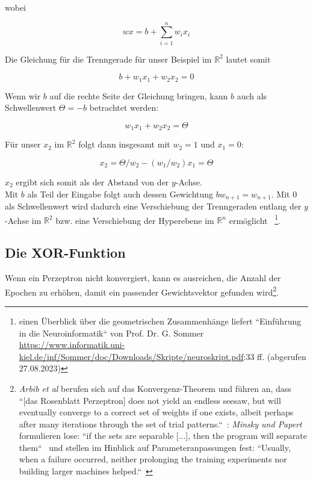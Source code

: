 \noindent
wobei

\begin{equation}
wx = b + \sum^n_{i=1} w_ix_i
\label{eq:gl-net}
\end{equation}

\noindent
Die Gleichung für die Trenngerade für unser Beispiel im $\mathbb{R}^2$ lautet somit

\begin{equation}
b + w_1x_1 + w_2x_2 = 0
\end{equation}

\noindent
Wenn wir $b$ auf die rechte Seite der Gleichung bringen, kann $b$ auch als Schwellenwert $\Theta = -b$ betrachtet werden:

\begin{equation}
w_1x_1 + w_2x_2 = \Theta
\end{equation}

\noindent
Für unser $x_2$ im $ \mathbb{R}^2$ folgt dann insgesamt mit $w_2 = 1$ und $x_1 = 0$:

\begin{equation}
x_2 = \Theta/w_2 -(w_1/w_2)x_1  = \Theta
\end{equation}

\noindent
$x_2$ ergibt sich somit als der Abstand von der $y$-Achse.\\

\noindent
Mit $b$ als Teil der Eingabe folgt auch dessen Gewichtung $bw_{n+1} = w_{n+1}$.
Mit $0$ als Schwellenwert wird dadurch eine Verschiebung der Trenngeraden entlang der $y$-Achse im $ \mathbb{R}^2$ bzw. eine Verschiebung der Hyperebene im $ \mathbb{R}^n$ ermöglicht~\cite[215]{Ert21a} \footnote{
    einen Überblick über die geometrischen Zusammenhänge liefert ``Einführung in die Neuroinformatik`` von Prof. Dr. G. Sommer \url{https://www.informatik.uni-kiel.de/inf/Sommer/doc/Downloads/Skripte/neuroskript.pdf}:33 ff. (abgerufen 27.08.2023)
}.



\subsection{Die XOR-Funktion}

Wenn ein Perzeptron nicht konvergiert, kann es ausreichen, die Anzahl der Epochen zu erhöhen, damit ein passender Gewichtsvektor gefunden wird\footnote{
    \textit{Arbib et al} berufen sich auf das Konvergenz-Theorem und führen an, dass ``[das Rosenblatt Perzeptron] does not yield an endless seesaw, but will eventually converge to a correct set of weights if one exists, albeit perhaps after many iterations through the set of trial patterns.``~\cite[20]{Arb03}: \textit{Minsky und Papert} formulieren lose: ``if the sets are separable [...], then the program will separate them``~\cite[165]{MP88} und stellen im Hinblick auf Parameteranpassungen fest: ``Usually, when a failure occurred, neither prolonging the training experiments nor building larger machines helped.``~\cite[xi]{MP88}
}.

